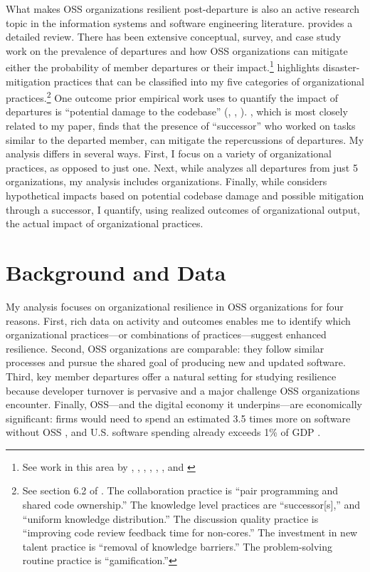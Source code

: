 \documentclass[12pt,notitlepage]{article}
\begin{document}
What makes OSS organizations resilient post-departure is also an active research topic in the information systems and software engineering literature. 
\cite{rashid_systematic_2019} provides a detailed review. 
There has been extensive conceptual, survey, and case study work on the prevalence of departures and how OSS organizations can mitigate either the probability of member departures or their impact.\footnote{See work in this area by \cite{von_krogh_community_2003}, \cite{robles_evolution_2005}, \cite{hannon_retaining_2008}, \cite{xu_volunteers_2010}, \cite{yu_empirical_2012}, \cite{rashid_exploring_2017}, and \cite{miller_why_2019}}
\cite{rashid_systematic_2019} highlights disaster-mitigation practices that can be classified into my five categories of organizational practices.\footnote{See section 6.2 of \cite{rashid_systematic_2019}. 
The collaboration practice is ``pair programming and shared code ownership.''
The knowledge level practices are ``successor[s],'' and ``uniform knowledge distribution.'' 
The discussion quality practice is ``improving code review feedback time for non-cores.''
The investment in new talent practice is ``removal of knowledge barriers.''
The problem-solving routine practice is ``gamification.''
}
One outcome prior empirical work uses to quantify the impact of departures is ``potential damage to the codebase'' (\citealt{izquierdo-cortazar_using_2009}, \citealt{rigby_quantifying_2016}, \citealt{nassif_revisiting_2017}). 
\citealt{rigby_quantifying_2016}, which is most closely related to my paper, finds that the presence of ``successor'' who worked on tasks similar to the departed member, can mitigate the repercussions of departures. 
My analysis differs in several ways.
First, I focus on a variety of organizational practices, as opposed to just one. 
Next, while \cite{rigby_quantifying_2016} analyzes all departures from just 5 organizations, my analysis includes \NumOrgs{} organizations.
Finally, while \cite{rigby_quantifying_2016} considers hypothetical impacts based on potential codebase damage and possible mitigation through a successor, I quantify, using realized outcomes of organizational output, the actual impact of organizational practices. 

\section{Background and Data} \label{sec:data}
My analysis focuses on organizational resilience in OSS organizations for four reasons.
First, rich data on activity and outcomes enables me to identify which organizational practices—or combinations of practices—suggest enhanced resilience.
Second, OSS organizations are comparable: they follow similar processes and pursue the shared goal of producing new and updated software.
Third, key member departures offer a natural setting for studying resilience because developer turnover is pervasive and a major challenge OSS organizations encounter.
Finally, OSS—and the digital economy it underpins—are economically significant: firms would need to spend an estimated 3.5 times more on software without OSS \citep{hoffmann_value_2024}, and U.S. software spending already exceeds 1\% of GDP \citep{WIPO_US_GDP_software}.
\end{document}
